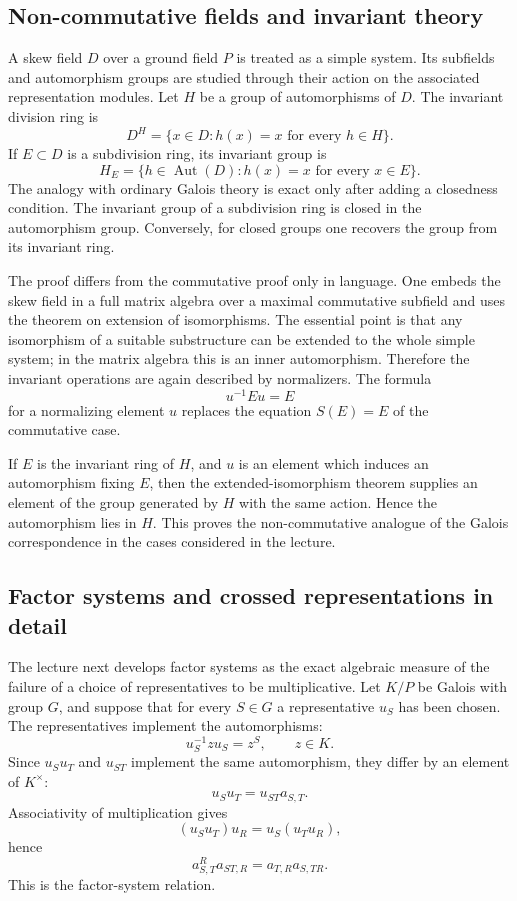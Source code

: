 \documentclass[12pt]{article}
\begin{document}
\subsection{Non-commutative fields and invariant theory}

A skew field \(D\) over a ground field \(P\) is treated as a simple system. Its subfields and automorphism groups are studied through their action on the associated representation modules. Let \(H\) be a group of automorphisms of \(D\). The invariant division ring is
\[
  D^H=\{x\in D: h(x)=x\text{ for every }h\in H\}.
\]
If \(E\subset D\) is a subdivision ring, its invariant group is
\[
  H_E=\{h\in\operatorname{Aut}(D):h(x)=x\text{ for every }x\in E\}.
\]
The analogy with ordinary Galois theory is exact only after adding a closedness condition. The invariant group of a subdivision ring is closed in the automorphism group. Conversely, for closed groups one recovers the group from its invariant ring.

The proof differs from the commutative proof only in language. One embeds the skew field in a full matrix algebra over a maximal commutative subfield and uses the theorem on extension of isomorphisms. The essential point is that any isomorphism of a suitable substructure can be extended to the whole simple system; in the matrix algebra this is an inner automorphism. Therefore the invariant operations are again described by normalizers. The formula
\[
  u^{-1}Eu=E
\]
for a normalizing element \(u\) replaces the equation \(S(E)=E\) of the commutative case.

If \(E\) is the invariant ring of \(H\), and \(u\) is an element which induces an automorphism fixing \(E\), then the extended-isomorphism theorem supplies an element of the group generated by \(H\) with the same action. Hence the automorphism lies in \(H\). This proves the non-commutative analogue of the Galois correspondence in the cases considered in the lecture.

\subsection{Factor systems and crossed representations in detail}

The lecture next develops factor systems as the exact algebraic measure of the failure of a choice of representatives to be multiplicative. Let \(K/P\) be Galois with group \(G\), and suppose that for every \(S\in G\) a representative \(u_S\) has been chosen. The representatives implement the automorphisms:
\[
  u_S^{-1} z u_S=z^S,
  \qquad z\in K.
\]
Since \(u_Su_T\) and \(u_{ST}\) implement the same automorphism, they differ by an element of \(K^{\times}\):
\[
  u_Su_T=u_{ST}a_{S,T}.
\]
Associativity of multiplication gives
\[
  (u_Su_T)u_R=u_S(u_Tu_R),
\]
hence
\[
  a_{S,T}^{R}a_{ST,R}=a_{T,R}a_{S,TR}.
\]
This is the factor-system relation.
\end{document}
